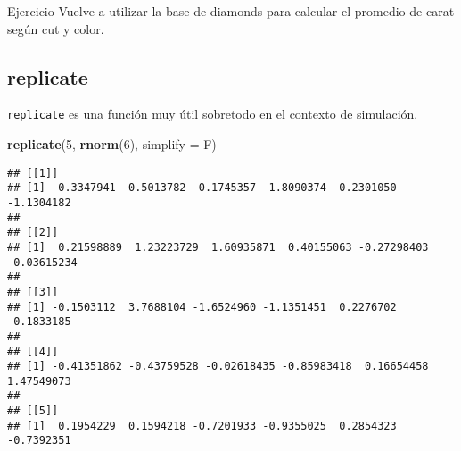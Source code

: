\documentclass[]{article}
\newenvironment{Shaded}{\begin{snugshade}}{\end{snugshade}}
\newcommand{\KeywordTok}[1]{\textcolor[rgb]{0.13,0.29,0.53}{\textbf{{#1}}}}
\newcommand{\DataTypeTok}[1]{\textcolor[rgb]{0.13,0.29,0.53}{{#1}}}
\newcommand{\DecValTok}[1]{\textcolor[rgb]{0.00,0.00,0.81}{{#1}}}
\newcommand{\StringTok}[1]{\textcolor[rgb]{0.31,0.60,0.02}{{#1}}}
\newcommand{\CommentTok}[1]{\textcolor[rgb]{0.56,0.35,0.01}{\textit{{#1}}}}
\newcommand{\NormalTok}[1]{{#1}}
\begin{document}
\renewcommand\bcStyleTitre[1]{\large\textcolor{bbblack}{#1}}

\begin{bclogo}[
  couleur=llred,
  arrondi=0,
  logo=\bcstop,
  barre=none,
  noborder=true]{Ejercicio}
Vuelve a utilizar la base de diamonds para calcular el promedio 
de carat según cut y color.
\end{bclogo}

\begin{Shaded}
\end{Shaded}

\subsection{replicate}\label{replicate}

\texttt{replicate} es una función muy útil sobretodo en el contexto de
simulación.

\begin{Shaded}
\begin{Highlighting}[]
\KeywordTok{replicate}\NormalTok{(}\DecValTok{5}\NormalTok{, }\KeywordTok{rnorm}\NormalTok{(}\DecValTok{6}\NormalTok{), }\DataTypeTok{simplify =} \NormalTok{F)}
\end{Highlighting}
\end{Shaded}

\begin{verbatim}
## [[1]]
## [1] -0.3347941 -0.5013782 -0.1745357  1.8090374 -0.2301050 -1.1304182
## 
## [[2]]
## [1]  0.21598889  1.23223729  1.60935871  0.40155063 -0.27298403 -0.03615234
## 
## [[3]]
## [1] -0.1503112  3.7688104 -1.6524960 -1.1351451  0.2276702 -0.1833185
## 
## [[4]]
## [1] -0.41351862 -0.43759528 -0.02618435 -0.85983418  0.16654458  1.47549073
## 
## [[5]]
## [1]  0.1954229  0.1594218 -0.7201933 -0.9355025  0.2854323 -0.7392351
\end{verbatim}
\end{document}

